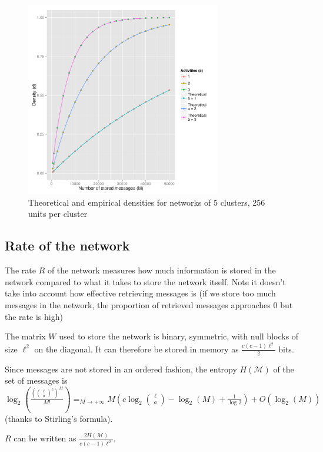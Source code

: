 \documentclass[english,10pt,twocolumn]{IEEEtran}
\theoremstyle{definition}
\begin{document}
	\begin{figure}[!htb]
		\includegraphics[width=8.5cm]{Courbes/c5l256densities}%
		\caption{Theoretical and empirical densities for networks of 5 clusters, 256 units per cluster }
			\label{densiteth}
	\end{figure}	
	
	

	\subsection{Rate of the network}	
	
	The rate $R$ of the network measures how much information is stored in the network compared to what it takes to store the network itself. Note it doesn't take into account how effective retrieving messages is (if we store too much messages in the network, the proportion of retrieved messages approaches $0$ but the rate is high)
	
	
		The matrix $W$ used to store the network is binary, symmetric, with null blocks of size $\ell^2$ on the diagonal. It can therefore be stored in memory as $\frac{c(c-1) \ell^2}{2}$ bits. 
		
		Since messages are not stored in an ordered fashion, the entropy $H(\mathcal{M})$ of the set of messages is $\log_2(\frac{({\ell \choose a}^c)^M}{M!}) \mathop{=}_{M \rightarrow +\infty} M(c \log_2{\ell \choose a } - \log_2(M) + \frac{1}{\log 2}) + O(\log_2(M)) $ (thanks to  Stirling's formula).%
		
		$R$ can be written as $\frac{2H(\mathcal{M})}{c(c-1) \ell^2}$.
		
\end{document}
